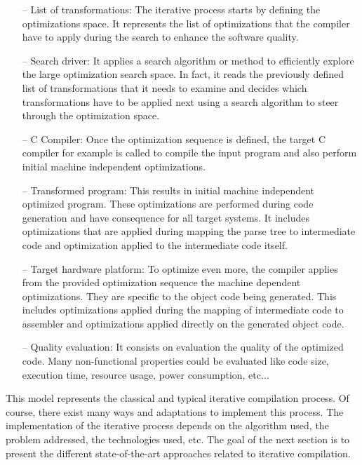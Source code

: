 \begin{itemize}
	\item[--] List of transformations:
	The iterative process starts by defining the optimizations space. It represents the list of optimizations that the compiler have to apply during the search to enhance the software quality.
	\item[--] Search driver:
	It applies a search algorithm or method to efficiently explore the large optimization search space. In fact, it reads the previously defined list of transformations that it needs to examine and decides which transformations have to be applied next using a search algorithm
	to steer through the optimization space.
	\item[--] C Compiler:
	Once the optimization sequence is defined, the target C compiler for example is called to compile the input program and also perform initial machine independent optimizations. 
	\item[--] Transformed program:
	This results in initial machine independent optimized program. These optimizations are performed during code generation and have consequence for all target systems. It includes optimizations that are applied during mapping the parse tree to intermediate code and optimization applied to the intermediate code itself.
	\item[--] Target hardware platform:
	To optimize even more, the compiler applies from the provided optimization sequence the machine dependent optimizations. They are specific to the object code being generated. This includes optimizations applied during the mapping of intermediate code to assembler and optimizations applied directly on the generated
	object code.
	\item[--] Quality evaluation:
	It consists on evaluation the quality of the optimized code. Many non-functional properties could be evaluated like code size, execution time, resource usage, power consumption, etc...
	
\end{itemize}

This model represents the classical and typical iterative compilation process. Of course, there exist many ways and adaptations to implement this process. The implementation of the iterative process depends on the algorithm used, the problem addressed, the technologies used, etc. The goal of the next section is to present the different state-of-the-art approaches related to iterative compilation.

